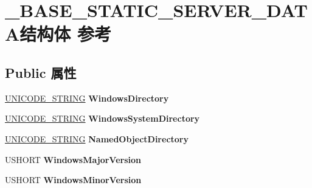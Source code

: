 \hypertarget{struct___b_a_s_e___s_t_a_t_i_c___s_e_r_v_e_r___d_a_t_a}{}\section{\+\_\+\+B\+A\+S\+E\+\_\+\+S\+T\+A\+T\+I\+C\+\_\+\+S\+E\+R\+V\+E\+R\+\_\+\+D\+A\+T\+A结构体 参考}
\label{struct___b_a_s_e___s_t_a_t_i_c___s_e_r_v_e_r___d_a_t_a}
\subsection*{Public 属性}
\begin{DoxyCompactItemize}
\item 
\mbox{\label{struct___b_a_s_e___s_t_a_t_i_c___s_e_r_v_e_r___d_a_t_a_a5aafe031e05070a8062eff3f68d075e9}} 
\hyperlink{struct___u_n_i_c_o_d_e___s_t_r_i_n_g}{U\+N\+I\+C\+O\+D\+E\+\_\+\+S\+T\+R\+I\+NG} {\bfseries Windows\+Directory}
\item 
\mbox{\label{struct___b_a_s_e___s_t_a_t_i_c___s_e_r_v_e_r___d_a_t_a_ac2e4d49e8734fcf59227386f2ad1cdcc}} 
\hyperlink{struct___u_n_i_c_o_d_e___s_t_r_i_n_g}{U\+N\+I\+C\+O\+D\+E\+\_\+\+S\+T\+R\+I\+NG} {\bfseries Windows\+System\+Directory}
\item 
\mbox{\label{struct___b_a_s_e___s_t_a_t_i_c___s_e_r_v_e_r___d_a_t_a_a2737d33a7690d3ca945f3dca3b4d1cb4}} 
\hyperlink{struct___u_n_i_c_o_d_e___s_t_r_i_n_g}{U\+N\+I\+C\+O\+D\+E\+\_\+\+S\+T\+R\+I\+NG} {\bfseries Named\+Object\+Directory}
\item 
\mbox{\label{struct___b_a_s_e___s_t_a_t_i_c___s_e_r_v_e_r___d_a_t_a_abca1060c65f6be9b6b9242ba1de01a08}} 
U\+S\+H\+O\+RT {\bfseries Windows\+Major\+Version}
\item 
\mbox{\label{struct___b_a_s_e___s_t_a_t_i_c___s_e_r_v_e_r___d_a_t_a_a4d21e889ccdd330592a2672c707ffc54}} 
U\+S\+H\+O\+RT {\bfseries Windows\+Minor\+Version}
\item 

\end{DoxyCompactItemize}
